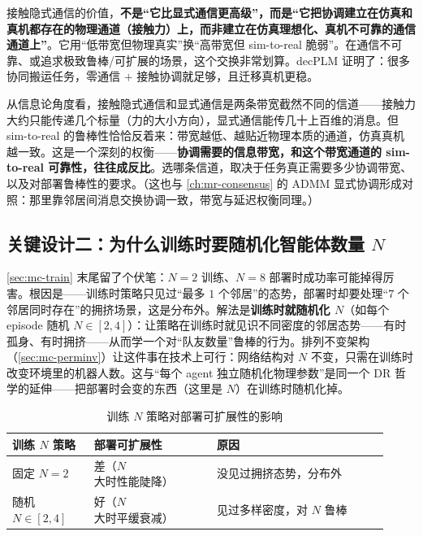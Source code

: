 \begin{insight}
接触隐式通信的价值，\textbf{不是“它比显式通信更高级”，而是“它把协调建立在仿真和真机都存在的物理通道（接触力）上，而非建立在仿真理想化、真机不可靠的通信通道上”}。它用“低带宽但物理真实”换“高带宽但 sim-to-real 脆弱”。在通信不可靠、或追求极致鲁棒/可扩展的场景，这个交换非常划算。decPLM 证明了：很多协同搬运任务，零通信 $+$ 接触协调就足够，且迁移真机更稳。
\end{insight}

\begin{insight}
从信息论角度看，接触隐式通信和显式通信是两条带宽截然不同的信道——接触力大约只能传递几个标量（力的大小方向），显式通信能传几十上百维的消息。但 sim-to-real 的鲁棒性恰恰反着来：带宽越低、越贴近物理本质的通道，仿真真机越一致。这是一个深刻的权衡——\textbf{协调需要的信息带宽，和这个带宽通道的 sim-to-real 可靠性，往往成反比}。选哪条信道，取决于任务真正需要多少协调带宽、以及对部署鲁棒性的要求。（这也与 \cref{ch:mr-consensus} 的 ADMM 显式协调形成对照：那里靠邻居间消息交换协调一致，带宽与延迟权衡同理。）
\end{insight}

\subsection{关键设计二：为什么训练时要随机化智能体数量 $N$}
\label{sec:mc-n-random}

\cref{sec:mc-train} 末尾留了个伏笔：$N{=}2$ 训练、$N{=}8$ 部署时成功率可能掉得厉害。根因是——训练时策略只见过“最多 $1$ 个邻居”的态势，部署时却要处理“$7$ 个邻居同时存在”的拥挤场景，这是分布外。解法是\textbf{训练时就随机化 $N$}（如每个 episode 随机 $N\in[2,4]$）：让策略在训练时就见识不同密度的邻居态势——有时孤身、有时拥挤——从而学一个对“队友数量”鲁棒的行为。排列不变架构（\cref{sec:mc-perminv}）让这件事在技术上可行：网络结构对 $N$ 不变，只需在训练时改变环境里的机器人数。这与“每个 agent 独立随机化物理参数”是同一个 DR 哲学的延伸——把部署时会变的东西（这里是 $N$）在训练时随机化掉。

\begin{table}[H]\centering\small
\caption{训练 $N$ 策略对部署可扩展性的影响}
\label{tab:mc-n-random}
\begin{tabular}{p{0.20\linewidth}p{0.30\linewidth}p{0.42\linewidth}}
\toprule
训练 $N$ 策略 & 部署可扩展性 & 原因 \\
\midrule
固定 $N{=}2$ & 差（$N$ 大时性能陡降） & 没见过拥挤态势，分布外 \\
随机 $N\in[2,4]$ & 好（$N$ 大时平缓衰减） & 见过多样密度，对 $N$ 鲁棒 \\
\bottomrule
\end{tabular}
\end{table}

